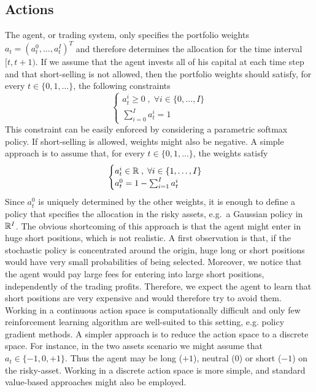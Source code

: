 \subsection{Actions}
The agent, or trading system, only specifies the portfolio weights $a_t = (a_t^0,
\ldots, a_t^I)^T$ and therefore determines the allocation for the time interval
$[t, t+1)$. If we assume that the agent invests all of his capital at each time
step and that short-selling is not allowed, then the portfolio weights should
satisfy, for every $t \in \{0, 1, \ldots\}$, the following constraints
\begin{equation}
	\begin{cases}
		a_t^i \geq 0 \;,\; \forall i \in \{0, \ldots, I\}\\
		\sum^{I}_{i=0} a_t^i = 1 
	\end{cases}
\end{equation}
This constraint can be easily enforced by considering a parametric softmax 
policy. If short-selling is allowed, weights might also be negative. A simple approach is to assume that, for every $t \in \{0, 1, \ldots\}$, the weights satisfy
\begin{equation}
	\begin{cases}
		a_t^i \in \mathbb{R} \;,\; \forall i \in \{1, \ldots, I\}\\
		a_t^0 = 1 - \sum^{I}_{i=1} a_t^i
	\end{cases}
\end{equation}
Since $a_t^0$ is uniquely determined by the other weights, it is enough to
define a policy that specifies the allocation in the risky assets, e.g.\ a
Gaussian policy in $\mathbb{R}^I$. The obvious shortcoming of this approach is that
the agent might enter in huge short positions, which is not realistic. A first
observation is that, if the stochastic policy is concentrated around the
origin, huge long or short positions would have very small probabilities of 
being selected. Moreover, we notice that the agent would pay large fees for 
entering into large short positions, independently of the trading profits. 
Therefore, we expect the agent to learn that short positions are very expensive 
and would therefore try to avoid them.\\
Working in a continuous action space is computationally difficult and only few
reinforcement learning algorithm are well-suited to this setting, e.g. policy
gradient methods. A simpler approach is to reduce the action space to a discrete 
space. For instance, in the two assets scenario we might assume that $a_t \in
\{-1, 0, +1\}$. Thus the agent may be long ($+1$), neutral ($0$) or short
($-1$) on the risky-asset. Working in a discrete action space is more simple,
and standard value-based approaches might also be employed. 
